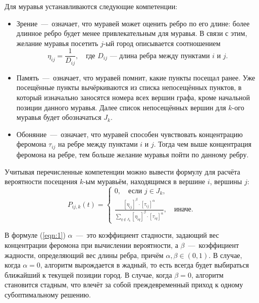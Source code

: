 Для муравья устанавливаются следующие компетенции:
\begin{itemize}
	\item Зрение~---~означает, что муравей может оценить ребро по его длине: более длинное ребро будет менее привлекательным для муравья. В связи с этим, желание муравья посетить $j$-ый город описывается соотношением \begin{equation}
		\eta_{ij} = \frac{1}{D_{ij}}, \quad \text{где $D_{ij}$~---~длина ребра между пунктами $i$ и $j$.}
	\end{equation}
	\item Память~---~означает, что муравей помнит, какие пункты посещал ранее. Уже посещённые пункты вычёркиваются из списка непосещённых пунктов, в который изначально заносятся номера всех вершин графа, кроме начальной позиции данного муравья. Далее список непосещённых вершин для $k$-ого муравья будет обозначаться $J_k$.
	\item Обоняние~---~означает, что муравей способен чувствовать концентрацию феромона $\tau_{ij}$ на ребре между пунктами $i$ и $j$. Тогда чем выше концентрация феромона на ребре, тем больше желание муравья пойти по данному ребру.
\end{itemize}

Учитывая перечисленные компетенции можно вывести формулу для расчёта вероятности посещения $k$-ым муравьём, находящимся в вершине $i$, вершины  $j$:
\begin{equation} \label{eqn:1}
	P_{ij,k}(t) = \begin{cases}
		0, \quad \text{если $j \in J_k$,} \\
		\frac{\left[\eta_{ij}\right]^{\beta} \cdot \left[\tau_{ij}\right]^{\alpha}}{\sum_{q \notin J_k} \left[\eta_{iq}\right]^{\beta} \cdot \left[\tau_{iq}\right]^{\alpha}}, \quad \text{иначе.}
	\end{cases}
\end{equation}

В формуле (\ref{eqn:1}) $\alpha$~---~это коэффициент стадности, задающий вес концентрации феромона при вычислении вероятности, а $\beta$~---~коэффициент жадности, определяющий вес длины ребра, причём $\alpha,\beta \in (0,1)$. В случае, когда $\alpha = 0$, алгоритм вырождается в жадный, то есть всегда будет выбираться ближайший к текущей позиции город. В случае, когда $\beta = 0$, алгоритм становится стадным, что влечёт за собой преждевременный приход к одному субоптимальному решению.

